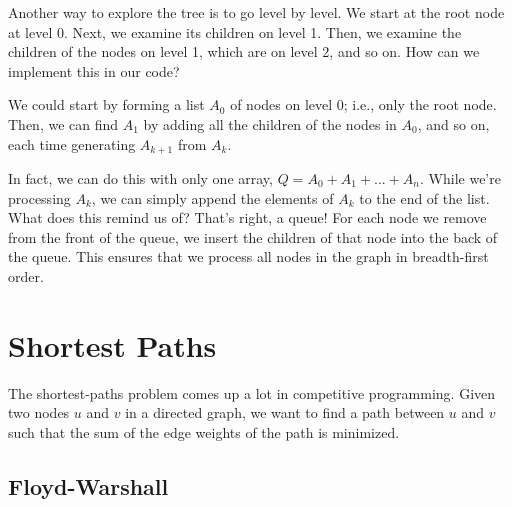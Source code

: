 Another way to explore the tree is to go level by level. We start at the root node at level 0. Next, we examine its children on level 1. Then, we examine the children of the nodes on level 1, which are on level 2, and so on. How can we implement this in our code?

We could start by forming a list $A_0$ of nodes on level 0; i.e., only the root node. Then, we can find $A_1$ by adding all the children of the nodes in $A_0$, and so on, each time generating $A_{k+1}$ from $A_k$.

In fact, we can do this with only one array, $Q = A_0 + A_1 + ... + A_n$. While we're processing $A_k$, we can simply append the elements of $A_k$ to the end of the list. What does this remind us of? That's right, a queue! For each node we remove from the front of the queue, we insert the children of that node into the back of the queue. This ensures that we process all nodes in the graph in breadth-first order.




\section{Shortest Paths}

The shortest-paths problem comes up a lot in competitive programming. Given two nodes $u$ and $v$ in a directed graph, we want to find a path between $u$ and $v$ such that the sum of the edge weights of the path is minimized.

\begin{center}
\end{center}


\subsection{Floyd-Warshall}

